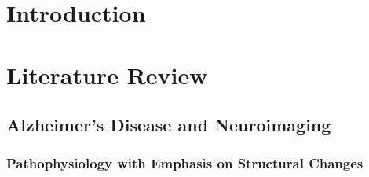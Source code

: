 \documentclass[12pt, a4paper]{article}
\begin{document}

\section{Introduction}



\section{Literature Review}


\subsection{Alzheimer's Disease and Neuroimaging}

\subsubsection{Pathophysiology with Emphasis on Structural Changes}
\end{document}
